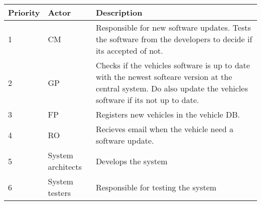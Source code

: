 		\begin{table}[H]
			\begin{tabular}{ p{2cm} | p{3.5cm} | p{7cm} }
				\hline
				\rowcolor{gray}
				{\bf Priority} & {\bf Actor} & {\bf Description} \\ \hline
					1 & CM & Responsible for new software updates. 
					Tests the software from the developers to decide if its accepted of not. \\ \hline
					2 & GP & Checks if the vehicles software is up to date with the newest 
					softeare version at the central system. Do also update the vehicles 
					software if its not up to date. \\ \hline
					3 & FP & Registers new vehicles in the vehicle DB. \\ \hline
					4 & RO & Recieves email when the vehicle need a software update. \\ \hline
					5 & System architects & Develops the system \\ \hline
					6 & System testers & Responsible for testing the system \\ \hline
				\end{tabular}
		\end{table}
